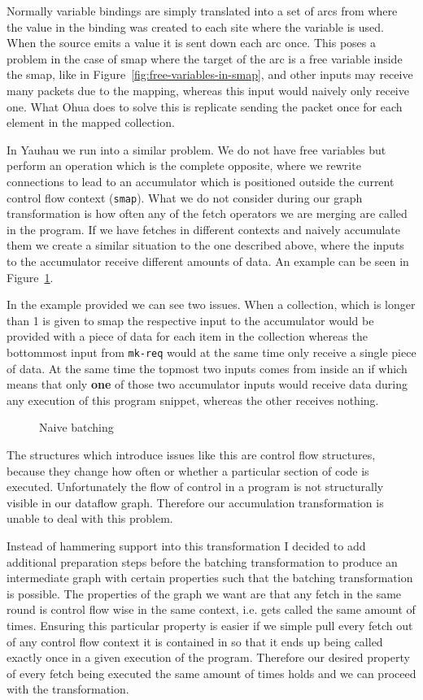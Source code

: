Normally variable bindings are simply translated into a set of arcs from where the value in the binding was created to each site where the variable is used.
When the source emits a value it is sent down each arc once.
This poses a problem in the case of smap where the target of the arc is a free variable inside the smap, like in Figure~\ref{fig:free-variables-in-smap}, and other inputs may receive many packets due to the mapping, whereas this input would naively only receive one.
What Ohua does to solve this is replicate sending the packet once for each element in the mapped collection.

In Yauhau we run into a similar problem.
We do not have free variables but perform an operation which is the complete opposite, where we rewrite connections to lead to an accumulator which is positioned outside the current control flow context (\texttt{smap}).
What we do not consider during our graph transformation is how often any of the fetch operators we are merging are called in the program.
If we have fetches in different contexts and naively accumulate them we create a similar situation to the one described above, where the inputs to the accumulator receive different amounts of data.
An example can be seen in Figure~\ref{fig:naive-batching-context-problem}.

In the example provided we can see two issues.
When a collection, which is longer than 1 is given to smap the respective input to the accumulator would be provided with a piece of data for each item in the collection whereas the bottommost input from \texttt{mk-req} would at the same time only receive a single piece of data.
At the same time the topmost two inputs comes from inside an if which means that only \textbf{one} of those two accumulator inputs would receive data during any execution of this program snippet, whereas the other receives nothing.

\begin{figure}
	\caption{Naive batching}
	\label{fig:naive-batching-context-problem}
\end{figure}

The structures which introduce issues like this are control flow structures, because they change how often or whether a particular section of code is executed.
Unfortunately the flow of control in a program is not structurally visible in our dataflow graph.
Therefore our accumulation transformation is unable to deal with this problem.

Instead of hammering support into this transformation I decided to add additional preparation steps before the batching transformation to produce an intermediate graph with certain properties such that the batching transformation is possible.
The properties of the graph we want are that any fetch in the same round is control flow wise in the same context, i.e. gets called the same amount of times.
Ensuring this particular property is easier if we simple pull every fetch out of any control flow context it is contained in so that it ends up being called exactly once in a given execution of the program.
Therefore our desired property of every fetch being executed the same amount of times holds and we can proceed with the transformation.

